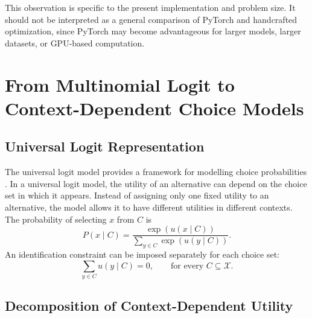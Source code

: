 \documentclass[12pt,oneside]{report}
\newcommand{\X}{\mathcal{X}}
\begin{document}
This observation is specific to the present implementation and problem
size. It should not be interpreted as a general comparison of PyTorch
and handcrafted optimization, since PyTorch may become advantageous
for larger models, larger datasets, or GPU-based computation.

\chapter{From Multinomial Logit to Context-Dependent Choice Models}
\section{Universal Logit Representation}
The universal logit model provides a framework for modelling
choice probabilities \citep{mcfadden1975}.
In a universal logit model, the utility of an alternative can depend on the
choice set in which it appears. Instead of assigning only one fixed utility to
an alternative, the model allows it to have different utilities in different
contexts.
The probability of selecting $x$ from $C$ is
\begin{equation}
    P(x\mid C)
    =
    \frac{\exp(u(x\mid C))}
    {\displaystyle\sum_{y\in C}\exp(u(y\mid C))}.
    \label{eq:context-logit}
\end{equation}
An identification constraint can be imposed separately for each choice set:
\begin{equation}
    \sum_{y\in C}u(y\mid C)=0,
    \qquad
    \text{for every } C\subseteq\X.
\end{equation}
\section{Decomposition of Context-Dependent Utility}
\end{document}
